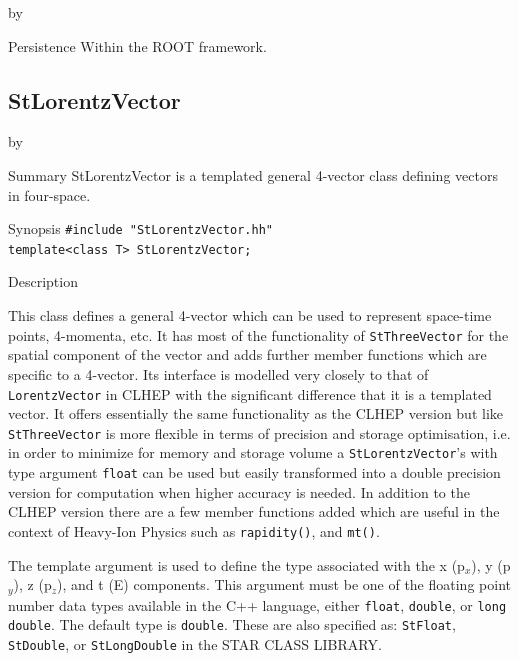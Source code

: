 \documentclass[twoside]{article}
\newcommand{\comp}[1]{\texttt{#1}}%
\newcommand{\entrylabel}[1]{\mbox{\textbf{{#1}}}\hfil}%
\newenvironment{entry}
{\begin{list}{}%
    {\renewcommand{\makelabel}{\entrylabel}%
     \setlength{\labelwidth}{90pt}%
     \setlength{\leftmargin}{\labelwidth}
     \advance\leftmargin by \labelsep%
      }%
    }%
  {\end{list}}
\newcommand{\Entrylabel}[1]%
{\raisebox{0pt}[1ex][0pt]{\makebox[\labelwidth][l]%
    {\parbox[t]{\labelwidth}{\hspace{0pt}\textbf{{#1}}}}}}
\newenvironment{Entry}%
{\renewcommand{\entrylabel}{\Entrylabel}\begin{entry}}%
  {\end{entry}}
\begin{document}
\begin{description}
\begin{Entry}
\item[Persistence]
    Within the ROOT framework.

\end{Entry}

\clearpage

%
%
\subsection{StLorentzVector } \label{StLorentzVector}
\begin{Entry}
\item[Summary]
    StLorentzVector is a templated general 4-vector class defining
    vectors in four-space.

\item[Synopsis]
    \verb+#include "StLorentzVector.hh"+ \\
    \verb+template<class T> StLorentzVector;+
    
    
\item[Description]   
    
    This class defines a general 4-vector which can be used to
    represent space-time points, 4-momenta, etc.  It has most of the
    functionality of \comp{StThreeVector} for the spatial component
    of the vector and adds further member functions which are specific
    to a 4-vector.  Its interface is modelled very closely to that of
    \comp{LorentzVector} in CLHEP  with the significant
    difference that it is a templated vector.
    It offers essentially the
    same functionality as the CLHEP version but like \comp{StThreeVector}
    is more flexible in terms of precision and storage optimisation, i.e.
    in order to minimize for memory and storage volume a \comp{StLorentzVector}'s
    with type argument \comp{float} can be used but easily
    transformed into a double precision version for computation when
    higher accuracy is needed.  In addition to the CLHEP version there
    are a few member functions added which are useful in the context
    of Heavy-Ion Physics such as \comp{rapidity()}, and \comp{mt()}.
    
    The template argument is used to define the type associated with
    the x (p$_{x}$), y (p$_{y}$), z (p$_{z}$), and t (E) components.
    This argument must be one of the floating
    point number data types available in the C++ language, either
    \comp{float}, \comp{double}, or \comp{long double}. The
    default type is \comp{double}.  These are also specified as:
    \comp{StFloat}, \comp{StDouble}, or \comp{StLongDouble} in
    the STAR CLASS LIBRARY.
    

\end{Entry}
\end{description}
\end{document}
